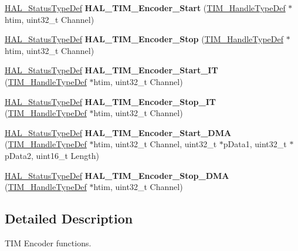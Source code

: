 \begin{DoxyCompactItemize}
\item 
\mbox{\label{group___t_i_m___exported___functions___group6_ga6450b21fa2bf6bf71a0f85c0a1519e21}} 
\hyperlink{stm32f4xx__hal__def_8h_a63c0679d1cb8b8c684fbb0632743478f}{H\+A\+L\+\_\+\+Status\+Type\+Def} {\bfseries H\+A\+L\+\_\+\+T\+I\+M\+\_\+\+Encoder\+\_\+\+Start} (\hyperlink{struct_t_i_m___handle_type_def}{T\+I\+M\+\_\+\+Handle\+Type\+Def} $\ast$htim, uint32\+\_\+t Channel)
\item 
\mbox{\label{group___t_i_m___exported___functions___group6_ga2d603e9167803b080be1f2915e972bbf}} 
\hyperlink{stm32f4xx__hal__def_8h_a63c0679d1cb8b8c684fbb0632743478f}{H\+A\+L\+\_\+\+Status\+Type\+Def} {\bfseries H\+A\+L\+\_\+\+T\+I\+M\+\_\+\+Encoder\+\_\+\+Stop} (\hyperlink{struct_t_i_m___handle_type_def}{T\+I\+M\+\_\+\+Handle\+Type\+Def} $\ast$htim, uint32\+\_\+t Channel)
\item 
\mbox{\label{group___t_i_m___exported___functions___group6_ga9a573a3203752709841acab8412f541e}} 
\hyperlink{stm32f4xx__hal__def_8h_a63c0679d1cb8b8c684fbb0632743478f}{H\+A\+L\+\_\+\+Status\+Type\+Def} {\bfseries H\+A\+L\+\_\+\+T\+I\+M\+\_\+\+Encoder\+\_\+\+Start\+\_\+\+IT} (\hyperlink{struct_t_i_m___handle_type_def}{T\+I\+M\+\_\+\+Handle\+Type\+Def} $\ast$htim, uint32\+\_\+t Channel)
\item 
\mbox{\label{group___t_i_m___exported___functions___group6_gac07923b4764255a1e0b82c975689542d}} 
\hyperlink{stm32f4xx__hal__def_8h_a63c0679d1cb8b8c684fbb0632743478f}{H\+A\+L\+\_\+\+Status\+Type\+Def} {\bfseries H\+A\+L\+\_\+\+T\+I\+M\+\_\+\+Encoder\+\_\+\+Stop\+\_\+\+IT} (\hyperlink{struct_t_i_m___handle_type_def}{T\+I\+M\+\_\+\+Handle\+Type\+Def} $\ast$htim, uint32\+\_\+t Channel)
\item 
\mbox{\label{group___t_i_m___exported___functions___group6_ga8b9798534ad0917d31d581afe720d8cf}} 
\hyperlink{stm32f4xx__hal__def_8h_a63c0679d1cb8b8c684fbb0632743478f}{H\+A\+L\+\_\+\+Status\+Type\+Def} {\bfseries H\+A\+L\+\_\+\+T\+I\+M\+\_\+\+Encoder\+\_\+\+Start\+\_\+\+D\+MA} (\hyperlink{struct_t_i_m___handle_type_def}{T\+I\+M\+\_\+\+Handle\+Type\+Def} $\ast$htim, uint32\+\_\+t Channel, uint32\+\_\+t $\ast$p\+Data1, uint32\+\_\+t $\ast$p\+Data2, uint16\+\_\+t Length)
\item 
\mbox{\label{group___t_i_m___exported___functions___group6_ga12ea48505e269532feff5b64f605b56f}} 
\hyperlink{stm32f4xx__hal__def_8h_a63c0679d1cb8b8c684fbb0632743478f}{H\+A\+L\+\_\+\+Status\+Type\+Def} {\bfseries H\+A\+L\+\_\+\+T\+I\+M\+\_\+\+Encoder\+\_\+\+Stop\+\_\+\+D\+MA} (\hyperlink{struct_t_i_m___handle_type_def}{T\+I\+M\+\_\+\+Handle\+Type\+Def} $\ast$htim, uint32\+\_\+t Channel)
\end{DoxyCompactItemize}


\subsection{Detailed Description}
T\+IM Encoder functions. 

